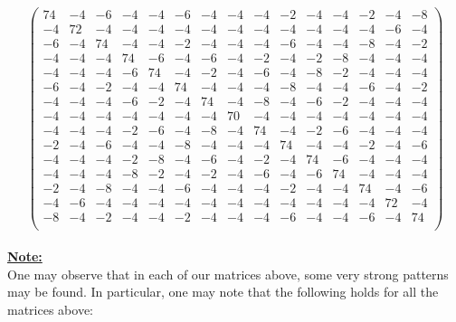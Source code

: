 \documentclass[11pt]{article}
\theoremstyle{plain}
\theoremstyle{definition}
\begin{document}
\[
\left(
\begin{array}{ccccccccccccccc}
	74 & -4 & -6 & -4 & -4 & -6 & -4 & -4 & -4 & -2 & -4 & -4 & -2 & -4 & -8 \\
	-4 & 72 & -4 & -4 & -4 & -4 & -4 & -4 & -4 & -4 & -4 & -4 & -4 & -6 & -4 \\
	-6 & -4 & 74 & -4 & -4 & -2 & -4 & -4 & -4 & -6 & -4 & -4 & -8 & -4 & -2 \\
	-4 & -4 & -4 & 74 & -6 & -4 & -6 & -4 & -2 & -4 & -2 & -8 & -4 & -4 & -4 \\
	-4 & -4 & -4 & -6 & 74 & -4 & -2 & -4 & -6 & -4 & -8 & -2 & -4 & -4 & -4 \\
	-6 & -4 & -2 & -4 & -4 & 74 & -4 & -4 & -4 & -8 & -4 & -4 & -6 & -4 & -2 \\
	-4 & -4 & -4 & -6 & -2 & -4 & 74 & -4 & -8 & -4 & -6 & -2 & -4 & -4 & -4 \\
	-4 & -4 & -4 & -4 & -4 & -4 & -4 & 70 & -4 & -4 & -4 & -4 & -4 & -4 & -4 \\
	-4 & -4 & -4 & -2 & -6 & -4 & -8 & -4 & 74 & -4 & -2 & -6 & -4 & -4 & -4 \\
	-2 & -4 & -6 & -4 & -4 & -8 & -4 & -4 & -4 & 74 & -4 & -4 & -2 & -4 & -6 \\
	-4 & -4 & -4 & -2 & -8 & -4 & -6 & -4 & -2 & -4 & 74 & -6 & -4 & -4 & -4 \\
	-4 & -4 & -4 & -8 & -2 & -4 & -2 & -4 & -6 & -4 & -6 & 74 & -4 & -4 & -4 \\
	-2 & -4 & -8 & -4 & -4 & -6 & -4 & -4 & -4 & -2 & -4 & -4 & 74 & -4 & -6 \\
	-4 & -6 & -4 & -4 & -4 & -4 & -4 & -4 & -4 & -4 & -4 & -4 & -4 & 72 & -4 \\
	-8 & -4 & -2 & -4 & -4 & -2 & -4 & -4 & -4 & -6 & -4 & -4 & -6 & -4 & 74 \\
\end{array}
\right)\]
\\
\textbf{\underline{Note:}} \\
One may observe that in each of our matrices above, some very strong patterns may be found. In particular, one may note that the following holds for all the matrices above:
\end{document}
